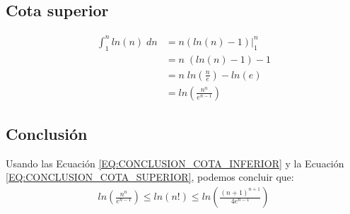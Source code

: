 \subsection{Cota superior}
\begin{align}
	\int_{1}^{n} \! ln(n)\;dn &= n(ln(n)-1) \bigg|_{1}^{n} \nonumber \\
	&=n\;\left(ln(n)-1\right) - 1 \nonumber \\
	&=n\;ln\left(\frac{n}{e}\right) - ln(e) \nonumber \\
	&=ln\left(\frac{n^{n}}{e^{n-1}}\right) \label{EQ:CONCLUSION_COTA_SUPERIOR}
\end{align}

\subsection{Conclusión}
Usando las Ecuación \ref{EQ:CONCLUSION_COTA_INFERIOR} y la Ecuación \ref{EQ:CONCLUSION_COTA_SUPERIOR}, podemos concluir que:
\begin{align}
	ln\left(\frac{n^{n}}{e^{n-1}}\right)
	\leq
	ln(n!)
	\leq
	ln\left(\frac{(n+1)^{n+1}}{4e^{n-1}}\right) \nonumber
\end{align}

